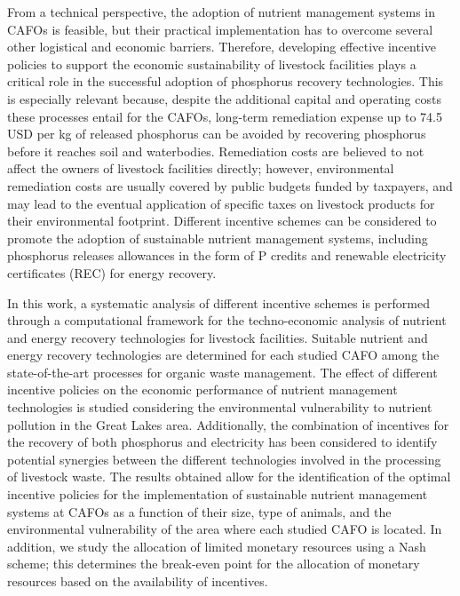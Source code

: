 \begin{refsection}[referencesCh5]
From a technical perspective, the adoption of nutrient management systems in CAFOs is feasible, but their practical implementation has to overcome several other logistical  and economic barriers.
Therefore, developing effective incentive policies to support the economic sustainability of livestock facilities plays a critical role in the successful adoption of phosphorus recovery technologies.
This is especially relevant because, despite the additional capital and operating costs these processes entail for the CAFOs, long-term remediation expense up to 74.5 USD per kg of released phosphorus \citep{Sampat2020} can be avoided by recovering phosphorus before it reaches soil and waterbodies. Remediation costs are believed to not affect the owners of livestock facilities directly; however, environmental remediation costs are usually covered by public budgets funded by taxpayers, and may lead to the eventual application of specific taxes on livestock products for their environmental footprint. Different incentive schemes can be considered to promote the adoption of sustainable nutrient management systems, including phosphorus releases allowances in the form of P credits and renewable electricity certificates (REC) for energy recovery.

In this work, a systematic analysis of different incentive schemes is performed through a computational framework for the techno-economic analysis of nutrient and energy recovery technologies for livestock facilities. Suitable nutrient and energy recovery technologies are determined for each studied CAFO among the state-of-the-art processes for organic waste management. The effect of different incentive policies on the economic performance of nutrient management technologies is studied considering the environmental vulnerability to nutrient pollution in the Great Lakes area. Additionally, the combination of incentives for the recovery of both phosphorus and electricity has been considered to identify potential synergies between the different technologies involved in the processing of livestock waste. The results obtained allow for the identification of the optimal incentive policies for the implementation of sustainable nutrient management systems at CAFOs as a function of their size, type of animals, and the environmental vulnerability of the area where each studied CAFO is located.  In addition, we study the allocation of limited monetary resources using a Nash scheme; this determines the break-even point for the allocation of monetary resources  based on the availability of incentives.


\end{refsection}
